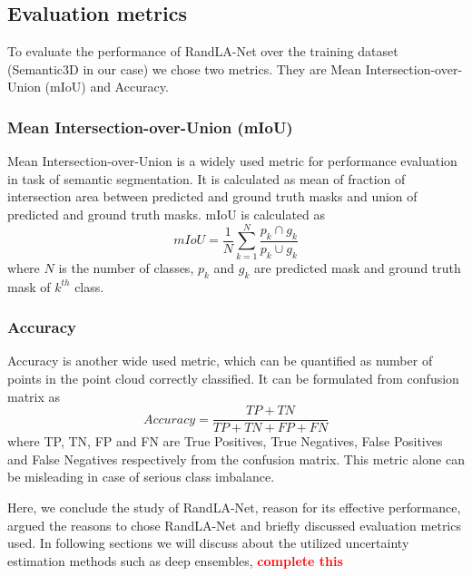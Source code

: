 \subsection{Evaluation metrics}
To evaluate the performance of RandLA-Net over the training dataset (Semantic3D in our case) we chose two metrics.
They are Mean Intersection-over-Union (mIoU) and Accuracy.

\subsubsection{Mean Intersection-over-Union (mIoU)}
Mean Intersection-over-Union is a widely used metric for performance evaluation in task of semantic segmentation.
It is calculated as mean of fraction of intersection area between predicted and ground truth masks and union of predicted and ground truth masks.
mIoU is calculated as
$$mIoU=\frac{1}{N}\sum_{k=1}^N \frac{p_k\cap g_k}{p_k \cup g_k}$$
where $N$ is the number of classes, $p_k$ and $g_k$ are predicted mask and ground truth mask of $k^{th}$ class.

\subsubsection{Accuracy}
Accuracy is another wide used metric, which can be quantified as number of points in the point cloud correctly classified.
It can be formulated from confusion matrix as
$$Accuracy = \frac{TP+TN}{TP+TN+FP+FN}$$
where TP, TN, FP and FN are True Positives, True Negatives, False Positives and False Negatives respectively from the confusion matrix.
This metric alone can be misleading in case of serious class imbalance.

Here, we conclude the study of RandLA-Net, reason for its effective performance, argued the reasons to chose RandLA-Net and briefly discussed evaluation metrics used.
In following sections we will discuss about the utilized uncertainty estimation methods such as deep ensembles, \textcolor{red}{\textbf{complete this}}

